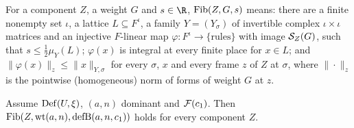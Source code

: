 \begin{definition}\label{pf:lift1:fibreat}
For a component $Z$, a weight $G$ and $s\in\R$, $\mathrm{Fib}(Z,G,s)$ means: there are a finite
nonempty set $\iota$, a lattice $L\subseteq F^\iota$, a family $Y=(Y_\sigma)$ of invertible complex
$\iota\times\iota$ matrices and an injective $F$-linear map $\varphi\colon F^\iota\to\{\text{rules}\}$
with image $\mathcal S_Z(G)$, such that $s\le\frac12\mu_Y(L)$; $\varphi(x)$ is integral at every
finite place for $x\in L$; and $\|\varphi(x)\|_{z}\le\|x\|_{Y,\sigma}$ for every $\sigma$, $x$ and every
frame $z$ of $Z$ at $\sigma$, where $\|\cdot\|_z$ is the pointwise (homogeneous) norm of forms of weight
$G$ at $z$.
\end{definition}

\begin{proposition}\label{pf:lift1:fibre}
Assume $\mathrm{Def}(U,\xi)$, $(a,n)$ dominant and $\mathcal F(c_1)$. Then
$\mathrm{Fib}(Z,\mathrm{wt}(a,n),\mathrm{defB}(a,n,c_1))$ holds for every component $Z$.
\end{proposition}

